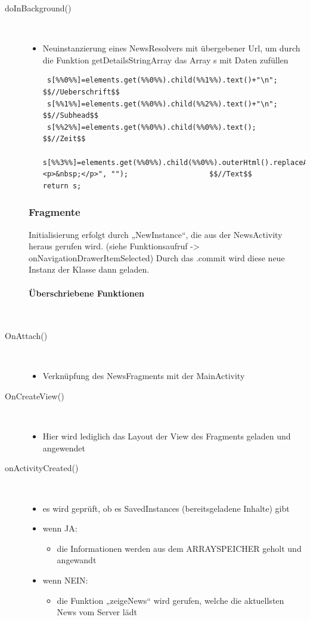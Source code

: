 \begin{description}
\item[doInBackground()]~\par
\begin{itemize}
\item Neuinstanzierung eines NewsResolvers mit übergebener Url, um durch die Funktion getDetailsStringArray das Array s mit Daten zufüllen
\begin{lstlisting}
 s[%%0%%]=elements.get(%%0%%).child(%%1%%).text()+"\n";   $$//Ueberschrift$$
 s[%%1%%]=elements.get(%%0%%).child(%%2%%).text()+"\n";   $$//Subhead$$
 s[%%2%%]=elements.get(%%0%%).child(%%0%%).text();        $$//Zeit$$
 s[%%3%%]=elements.get(%%0%%).child(%%0%%).outerHtml().replaceAll("<p>&nbsp;</p>", "");                   $$//Text$$
return s; 
\end{lstlisting}
\end{itemize}
\newpage
\subsubsection{Fragmente}
Initialisierung erfolgt durch „NewInstance“, die aus der NewsActivity heraus gerufen wird. (siehe Funktionsaufruf -> onNavigationDrawerItemSelected)
Durch das .commit wird diese neue Instanz der Klasse dann geladen.
\paragraph{Überschriebene Funktionen}
\ \\[1em]
\item[OnAttach()]~\par
\begin{itemize}
\item Verknüpfung des NewsFragments mit der MainActivity
\end{itemize}

\item[OnCreateView()]~\par
\begin{itemize}
\item Hier wird lediglich das Layout der View des Fragments geladen und angewendet
\end{itemize}

\item[onActivityCreated()]~\par
\begin{itemize}
\item es wird geprüft, ob es SavedInstances (bereitsgeladene Inhalte) gibt
\item wenn JA:
\begin{itemize}
\item die Informationen werden aus dem ARRAYSPEICHER geholt und angewandt
\end{itemize}
\item wenn NEIN:
\begin{itemize}
\item die Funktion „zeigeNews“ wird gerufen, welche die aktuellsten News vom Server lädt
\end{itemize}
\end{itemize}


\end{description}
